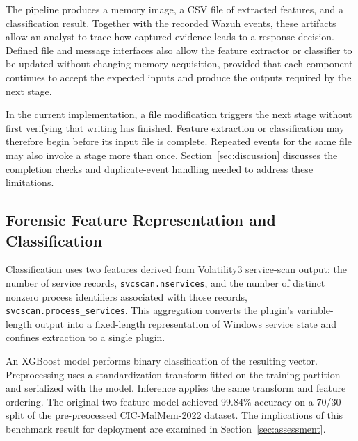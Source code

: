 \documentclass[conference]{IEEEtran}
\begin{document}


The pipeline produces a memory image, a CSV file of extracted features, and a classification result. Together with the recorded Wazuh events, these artifacts allow an analyst to trace how captured evidence leads to a response decision. Defined file and message interfaces also allow the feature extractor or classifier to be updated without changing memory acquisition, provided that each component continues to accept the expected inputs and produce the outputs required by the next stage.

In the current implementation, a file modification triggers the next stage without first verifying that writing has finished. Feature extraction or classification may therefore begin before its input file is complete. Repeated events for the same file may also invoke a stage more than once. Section~\ref{sec:discussion} discusses the completion checks and duplicate-event
handling needed to address these limitations.


\subsection{Forensic Feature Representation and Classification}
Classification uses two features derived from Volatility3 service-scan output: the number of service records, \texttt{svcscan.nservices}, and the number of distinct nonzero process identifiers associated with those records, \texttt{svcscan.process\_services}. This aggregation converts the plugin's variable-length output into a fixed-length representation of Windows service state and confines extraction to a single plugin.

An XGBoost model performs binary classification of the resulting vector. Preprocessing uses a standardization transform fitted on the training partition and serialized with the model. Inference applies the same transform and feature ordering. The original two-feature model achieved 99.84\% accuracy on a 70/30 split of the pre-preocessed CIC-MalMem-2022 dataset. The implications of this benchmark result for deployment are examined in Section~\ref{sec:assessment}.
\end{document}

